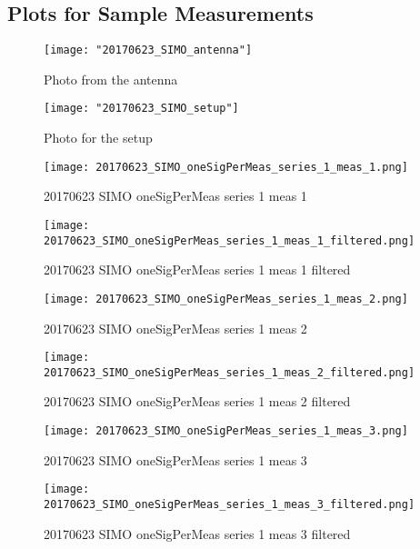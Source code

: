 \subsection{Plots for Sample Measurements}
\begin{figure}[ht] \caption{Photo from the antenna}
\texttt{[image: "20170623\_SIMO\_antenna"]}\centering\end{figure}
\begin{figure}[ht] \caption{Photo for the setup}
\texttt{[image: "20170623\_SIMO\_setup"]}\centering\end{figure}
\begin{figure}[ht] \caption{20170623 SIMO oneSigPerMeas series 1 meas 1}
\texttt{[image: 20170623\_SIMO\_oneSigPerMeas\_series\_1\_meas\_1.png]}\centering\end{figure}
\begin{figure}[ht] \caption{20170623 SIMO oneSigPerMeas series 1 meas 1 filtered}
\texttt{[image: 20170623\_SIMO\_oneSigPerMeas\_series\_1\_meas\_1\_filtered.png]}\centering\end{figure}
\begin{figure}[ht] \caption{20170623 SIMO oneSigPerMeas series 1 meas 2}
\texttt{[image: 20170623\_SIMO\_oneSigPerMeas\_series\_1\_meas\_2.png]}\centering\end{figure}
\begin{figure}[ht] \caption{20170623 SIMO oneSigPerMeas series 1 meas 2 filtered}
\texttt{[image: 20170623\_SIMO\_oneSigPerMeas\_series\_1\_meas\_2\_filtered.png]}\centering\end{figure}
\begin{figure}[ht] \caption{20170623 SIMO oneSigPerMeas series 1 meas 3}
\texttt{[image: 20170623\_SIMO\_oneSigPerMeas\_series\_1\_meas\_3.png]}\centering\end{figure}
\begin{figure}[ht] \caption{20170623 SIMO oneSigPerMeas series 1 meas 3 filtered}
\texttt{[image: 20170623\_SIMO\_oneSigPerMeas\_series\_1\_meas\_3\_filtered.png]}\centering\end{figure}
\clearpage
